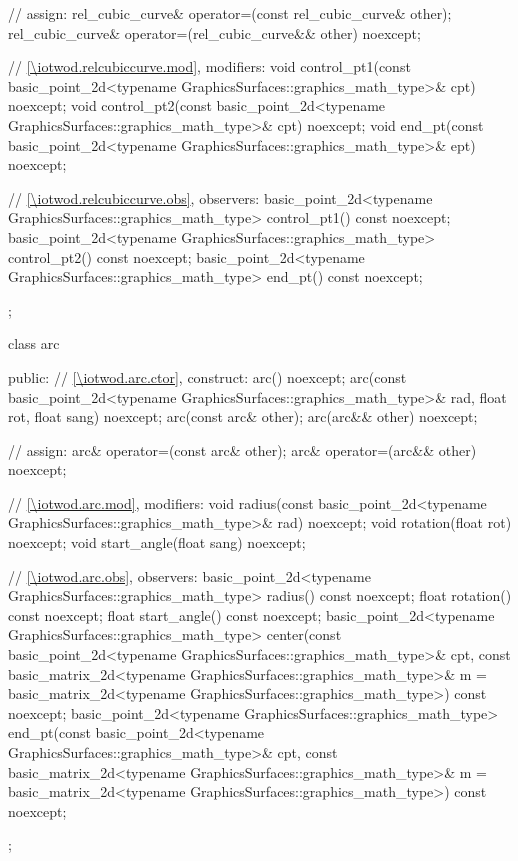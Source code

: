 \begin{codeblock}
{{{      // assign:
      rel_cubic_curve& operator=(const rel_cubic_curve& other);
      rel_cubic_curve& operator=(rel_cubic_curve&& other) noexcept;

      // \ref{\iotwod.relcubiccurve.mod}, modifiers:
      void control_pt1(const basic_point_2d<typename
        GraphicsSurfaces::graphics_math_type>& cpt) noexcept;
      void control_pt2(const basic_point_2d<typename
        GraphicsSurfaces::graphics_math_type>& cpt) noexcept;
      void end_pt(const basic_point_2d<typename
        GraphicsSurfaces::graphics_math_type>& ept) noexcept;

      // \ref{\iotwod.relcubiccurve.obs}, observers:
      basic_point_2d<typename GraphicsSurfaces::graphics_math_type> control_pt1() const noexcept;
      basic_point_2d<typename GraphicsSurfaces::graphics_math_type> control_pt2() const noexcept;
      basic_point_2d<typename GraphicsSurfaces::graphics_math_type> end_pt() const noexcept;
    };

    class arc {
    public:
      // \ref{\iotwod.arc.ctor}, construct:
      arc() noexcept;
      arc(const basic_point_2d<typename GraphicsSurfaces::graphics_math_type>& rad, float rot, float sang) noexcept;
      arc(const arc& other);
      arc(arc&& other) noexcept;

      // assign:
      arc& operator=(const arc& other);
      arc& operator=(arc&& other) noexcept;

      // \ref{\iotwod.arc.mod}, modifiers:
      void radius(const basic_point_2d<typename GraphicsSurfaces::graphics_math_type>& rad) noexcept;
      void rotation(float rot) noexcept;
      void start_angle(float sang) noexcept;

      // \ref{\iotwod.arc.obs}, observers:
      basic_point_2d<typename GraphicsSurfaces::graphics_math_type> radius() const noexcept;
      float rotation() const noexcept;
      float start_angle() const noexcept;
      basic_point_2d<typename GraphicsSurfaces::graphics_math_type> center(const basic_point_2d<typename
        GraphicsSurfaces::graphics_math_type>& cpt, const basic_matrix_2d<typename
        GraphicsSurfaces::graphics_math_type>& m = basic_matrix_2d<typename
        GraphicsSurfaces::graphics_math_type>{}) const noexcept;
      basic_point_2d<typename GraphicsSurfaces::graphics_math_type> end_pt(const basic_point_2d<typename
        GraphicsSurfaces::graphics_math_type>& cpt, const basic_matrix_2d<typename
        GraphicsSurfaces::graphics_math_type>& m = basic_matrix_2d<typename
        GraphicsSurfaces::graphics_math_type>{}) const noexcept;
    };

}}
\end{codeblock}
